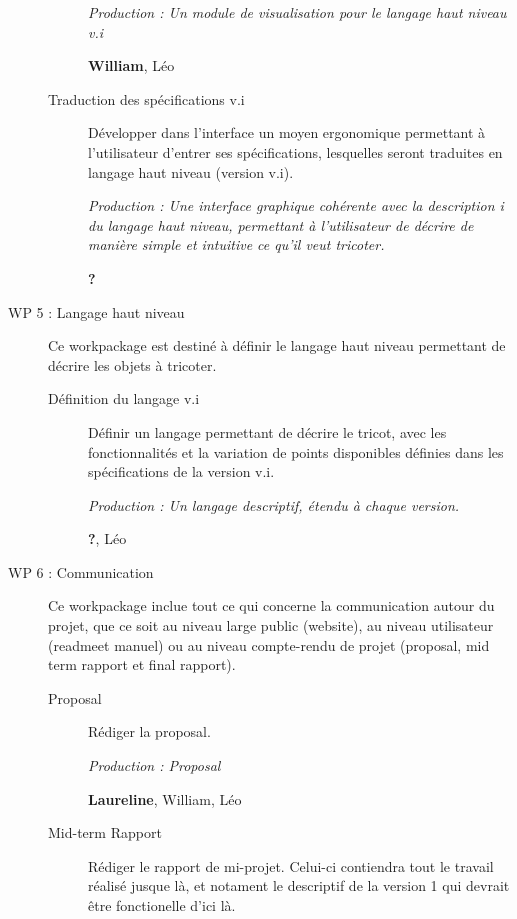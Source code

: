 \documentclass{article}
\begin{document}
\begin{description}
\begin{description}
    \textit{Production : Un module de visualisation pour le langage haut niveau v.i}
    
    \textbf{William}, Léo %
    
  \item[Traduction des spécifications v.i] Développer dans l'interface un moyen ergonomique permettant à l'utilisateur d'entrer ses spécifications, lesquelles seront traduites en langage haut niveau (version v.i).
  
    \textit{Production : Une interface graphique cohérente avec la description i du langage haut niveau, permettant à l'utilisateur de décrire de manière simple et intuitive ce qu'il veut tricoter.}
    
    \textbf{?}
  \end{description}

\medskip

\item[WP 5 : Langage haut niveau] Ce workpackage est destiné à définir le langage haut niveau permettant de décrire les objets à tricoter.

  \begin{description}
  \item[Définition du langage v.i] Définir un langage permettant de décrire le tricot, avec les fonctionnalités et la variation de points disponibles définies dans les spécifications de la version v.i.
    
    \textit{Production : Un langage descriptif, étendu à chaque version.}
    
    \textbf{?}, Léo
  \end{description}

\medskip

\item[WP 6 : Communication] Ce workpackage inclue tout ce qui concerne la communication autour du projet, que ce soit au niveau large public (website), au niveau utilisateur (readmeet manuel) ou au niveau compte-rendu de projet (proposal, mid term rapport et final rapport).

  \begin{description}
  \item[Proposal] Rédiger la proposal.
    
    \textit{Production : Proposal}
    
    \textbf{Laureline}, William, Léo
    
  \item[Mid-term Rapport] Rédiger le rapport de mi-projet. Celui-ci contiendra tout le travail réalisé jusque là, et notament le descriptif de la version 1 qui devrait être fonctionelle d'ici là.
    

\end{description}
\end{description}
\end{document}
